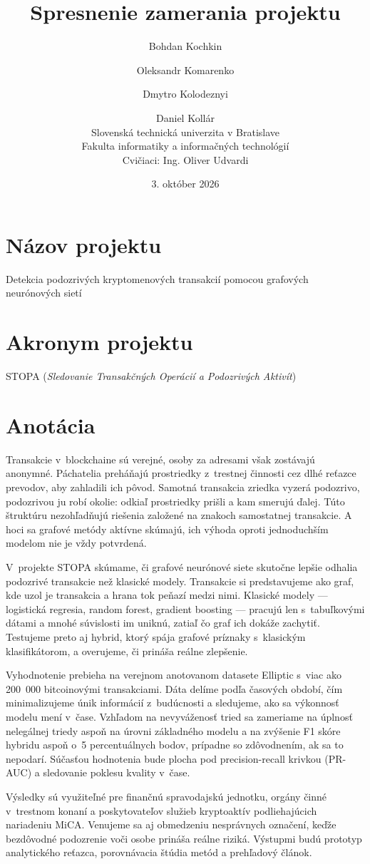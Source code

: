 \documentclass[11pt,a4paper,slovak]{article}
\title{Spresnenie zamerania projektu}
\author{Bohdan Kochkin \and Oleksandr Komarenko \and Dmytro Kolodeznyi \and Daniel Kollár\\[6pt]
	{\small Slovenská technická univerzita v Bratislave}\\
	{\small Fakulta informatiky a informačných technológií}\\[4pt]
	{\small Cvičiaci: Ing. Oliver Udvardi}
	}
\date{\small 3. október 2026}
\begin{document}
\maketitle

\section*{Názov projektu}

Detekcia podozrivých kryptomenových transakcií pomocou grafových neurónových
sietí

\section*{Akronym projektu}

STOPA (\emph{Sledovanie Transakčných Operácií a Podozrivých Aktivít})

\section*{Anotácia}

Transakcie v~blockchaine sú verejné, osoby za adresami však zostávajú anonymné.
Páchatelia preháňajú prostriedky z~trestnej činnosti cez dlhé reťazce prevodov,
aby zahladili ich pôvod. Samotná transakcia zriedka vyzerá podozrivo, podozrivou
ju robí okolie: odkiaľ prostriedky prišli a kam smerujú ďalej. Túto štruktúru
nezohľadňujú riešenia založené na znakoch samostatnej transakcie. A hoci sa
grafové metódy aktívne skúmajú, ich výhoda oproti jednoduchším modelom nie je
vždy potvrdená.

V~projekte STOPA skúmame, či grafové neurónové siete skutočne lepšie odhalia
podozrivé transakcie než klasické modely. Transakcie si predstavujeme ako graf,
kde uzol je transakcia a hrana tok peňazí medzi nimi. Klasické modely ---
logistická regresia, random forest, gradient boosting --- pracujú len
s~tabuľkovými dátami a mnohé súvislosti im uniknú, zatiaľ čo graf ich dokáže
zachytiť. Testujeme preto aj hybrid, ktorý spája grafové príznaky s~klasickým
klasifikátorom, a overujeme, či prináša reálne zlepšenie.

Vyhodnotenie prebieha na verejnom anotovanom datasete Elliptic s~viac ako
200~000 bitcoinovými transakciami. Dáta delíme podľa časových období, čím
minimalizujeme únik informácií z~budúcnosti a sledujeme, ako sa výkonnosť modelu
mení v~čase. Vzhľadom na nevyváženosť tried sa zameriame na úplnosť nelegálnej
triedy aspoň na úrovni základného modelu a na zvýšenie F1 skóre hybridu aspoň
o~5 percentuálnych bodov, prípadne so zdôvodnením, ak sa to nepodarí. Súčasťou
hodnotenia bude plocha pod precision-recall krivkou (PR-AUC) a sledovanie
poklesu kvality v~čase.

Výsledky sú využiteľné pre finančnú spravodajskú jednotku, orgány činné
v~trestnom konaní a poskytovateľov služieb kryptoaktív podliehajúcich nariadeniu
MiCA. Venujeme sa aj obmedzeniu nesprávnych označení, keďže bezdôvodné
podozrenie voči osobe prináša reálne riziká. Výstupmi budú prototyp analytického
reťazca, porovnávacia štúdia metód a prehľadový článok.
\end{document}
